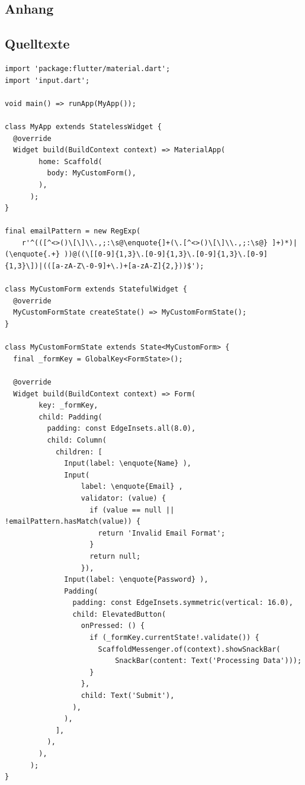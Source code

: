 \documentclass[11pt, twoside]{article}
\begin{document}
\begin{appendix} 

  
  \newpage
  
  \section*{Anhang} 
  \renewcommand{\thesubsection}{\Alph{subsection}}
  
  \subsection{Quelltexte} 
  \label{lab:ScreenshotsVonQlikView}
  

\begin{listing}[H]
	\label{lst:quelltext1}

    \begin{verbatim}
import 'package:flutter/material.dart';
import 'input.dart';

void main() => runApp(MyApp());

class MyApp extends StatelessWidget {
  @override
  Widget build(BuildContext context) => MaterialApp(
		home: Scaffold(
		  body: MyCustomForm(),
		),
	  );
}

final emailPattern = new RegExp(
    r'^(([^<>()\[\]\\.,;:\s@\enquote{]+(\.[^<>()\[\]\\.,;:\s@} ]+)*)|(\enquote{.+} ))@((\[[0-9]{1,3}\.[0-9]{1,3}\.[0-9]{1,3}\.[0-9]{1,3}\])|(([a-zA-Z\-0-9]+\.)+[a-zA-Z]{2,}))$');

class MyCustomForm extends StatefulWidget {
  @override
  MyCustomFormState createState() => MyCustomFormState();
}

class MyCustomFormState extends State<MyCustomForm> {
  final _formKey = GlobalKey<FormState>();

  @override
  Widget build(BuildContext context) => Form(
		key: _formKey,
		child: Padding(
		  padding: const EdgeInsets.all(8.0),
		  child: Column(
			children: [
			  Input(label: \enquote{Name} ),
			  Input(
				  label: \enquote{Email} ,
				  validator: (value) {
					if (value == null || !emailPattern.hasMatch(value)) {
					  return 'Invalid Email Format';
					}
					return null;
				  }),
			  Input(label: \enquote{Password} ),
			  Padding(
				padding: const EdgeInsets.symmetric(vertical: 16.0),
				child: ElevatedButton(
				  onPressed: () {
					if (_formKey.currentState!.validate()) {
					  ScaffoldMessenger.of(context).showSnackBar(
						  SnackBar(content: Text('Processing Data')));
					}
				  },
				  child: Text('Submit'),
				),
			  ),
			],
		  ),
		),
	  );
}
		

\end{verbatim}
\end{listing}
\end{appendix}
\end{document}
